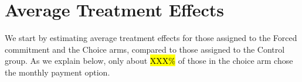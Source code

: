 \documentclass[oneside,11pt]{article}
\begin{document}








\section{Average Treatment Effects} \label{experiment}

We start by estimating average treatment effects for those assigned to the Forced commitment and the Choice arms, compared to those assigned to the Control group. As we explain below, only about \hl{XXX\%} of those in the choice arm chose the monthly payment option.

\end{document}
